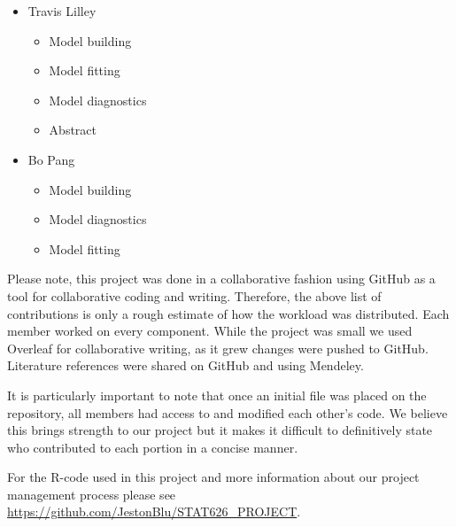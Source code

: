 \documentclass[twoside,twocolumn]{article}
\begin{document}
\begin{itemize}
	\item Travis Lilley
			 \begin{itemize}
			 \item Model building
			 \item Model fitting
			 \item Model diagnostics
			 \item Abstract
			 \end{itemize}

	\item{Bo Pang}
		\begin{itemize}
					\item Model building
		 			\item Model diagnostics
		 			\item Model fitting
		\end{itemize}
 \end{itemize}

Please note, this project was done in a collaborative fashion using GitHub as a tool for collaborative coding and writing. Therefore, the above list of contributions is only a rough estimate of how the workload was distributed. Each member worked on every component.  While the project was small we used Overleaf for collaborative writing, as it grew changes were pushed to GitHub.  Literature references were shared on GitHub and using Mendeley.  

It is particularly important to note that once an initial file was placed on the repository, all members had access to and modified each other's code. We believe this brings strength to our project but it makes it difficult to definitively state who contributed to each portion in a concise manner.

For  the R-code used in this project and more information about our project management process please see \url{https://github.com/JestonBlu/STAT626_PROJECT}.
\end{document}
